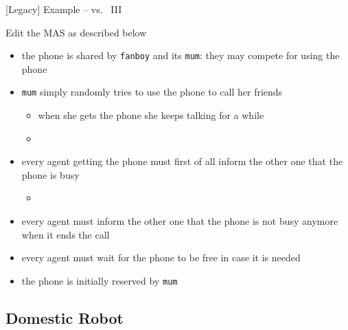 \documentclass[presentation]{beamer}\mode<presentation>{\usetheme{AMSBolognaFC}}
\begin{document}
\begin{frame}[c]{[Legacy] Example -- \agentspeakl{} vs.\ \jason{} III}
    \begin{block}{Edit the MAS as described below}
        \begin{itemize}
            \item the phone is shared by \alert{\texttt{fanboy}} and its \alert{\texttt{mum}}: they may compete for using the phone
            \item \texttt{mum} simply randomly tries to use the phone to call her friends \begin{itemize}
                \item when she gets the phone she keeps talking for a while
                \item {}
            \end{itemize}
            \item every agent getting the phone must first of all inform the other one that the phone is busy \begin{itemize}
                \item {}
            \end{itemize}
            \item every agent must inform the other one that the phone is not busy anymore when it ends the call
            \item every agent must wait for the phone to be free in case it is needed
            \item the phone is initially reserved by \texttt{mum}
        \end{itemize}
    \end{block}
\end{frame} 

\subsection{Domestic Robot}
\end{document}
